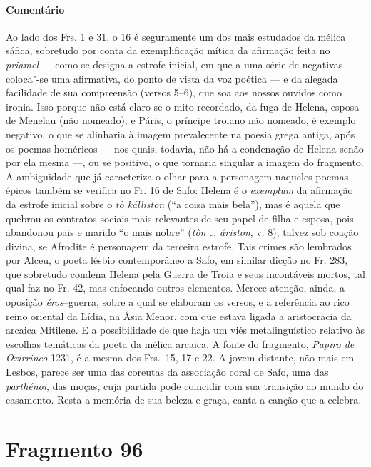 {\paragraph{Comentário} Ao lado dos Frs. 1 e 31, o 16 é seguramente um dos mais estudados da mélica
sáfica, sobretudo por conta da exemplificação mítica da afirmação feita no
\textit{priamel} --- como
se designa a estrofe inicial, em que a uma série de
negativas coloca"-se uma afirmativa, do ponto de vista da voz poética --- e da
alegada facilidade de sua compreensão (versos 5--6), que soa aos nossos ouvidos
como ironia. Isso porque não está claro se o mito recordado, da fuga de Helena, esposa 
de Menelau (não nomeado), e Páris, o príncipe troiano não nomeado, é exemplo
negativo, o que se alinharia à imagem prevalecente na poesia grega antiga, após
os poemas homéricos --- nos quais, todavia, não há a condenação de Helena senão por ela mesma ---, ou se positivo, o que tornaria singular a imagem do fragmento. A
ambiguidade que já caracteriza o olhar para a personagem naqueles poemas épicos também se verifica no Fr. 16 de Safo: Helena é o \textit{exemplum} da afirmação da estrofe inicial sobre o \textit{tò kálliston} (``a coisa mais bela''), mas é aquela que quebrou os contratos sociais mais relevantes de seu papel de filha e esposa, pois abandonou pais e marido ``o mais nobre'' (\textit{tòn \ldots{} áriston}, v. 8), talvez sob coação divina, se Afrodite é personagem da terceira estrofe. Tais crimes são lembrados por Alceu, o poeta lésbio contemporâneo a Safo, em similar dicção no Fr. 283, que sobretudo condena Helena pela Guerra de Troia e seus incontáveis mortos, tal qual faz no Fr. 42, mas enfocando outros elementos. Merece atenção, ainda, a
oposição \textit{éros}--guerra, sobre a qual se elaboram os versos, e a
referência ao rico reino oriental da Lídia, na Ásia Menor, com que estava
ligada a aristocracia da arcaica Mitilene. E a possibilidade de que haja um
viés metalinguístico relativo às escolhas temáticas da poeta da mélica arcaica.
A fonte do fragmento, \textit{Papiro de Oxirrinco} 1231, é a mesma dos Frs.~15, 17 e 22.
A jovem distante, não mais em Lesbos, parece ser uma das coreutas da associação coral de Safo, uma das \textit{parthénoi}, das moças, cuja partida pode coincidir com sua transição ao mundo do casamento. Resta a memória de sua beleza e graça, canta a canção que a celebra.




\pagebreak
\section{Fragmento 96}

}
